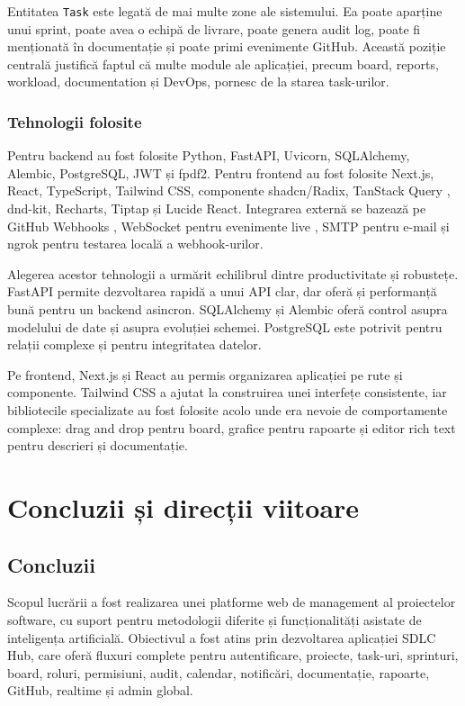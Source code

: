 \documentclass[12pt,a4paper]{report}
\begin{document}
Entitatea \texttt{Task} este legată de mai multe zone ale sistemului. Ea poate aparține unui sprint, poate avea o echipă de livrare, poate genera audit log, poate fi menționată în documentație și poate primi evenimente GitHub. Această poziție centrală justifică faptul că multe module ale aplicației, precum board, reports, workload, documentation și DevOps, pornesc de la starea task-urilor.

\subsection{Tehnologii folosite}
Pentru backend au fost folosite Python, FastAPI, Uvicorn, SQLAlchemy, Alembic, PostgreSQL, JWT și fpdf2. Pentru frontend au fost folosite Next.js, React, TypeScript, Tailwind CSS, componente shadcn/Radix, TanStack Query \cite{tanstackquery}, dnd-kit, Recharts, Tiptap și Lucide React. Integrarea externă se bazează pe GitHub Webhooks \cite{githubwebhooks}, WebSocket pentru evenimente live \cite{websocketmdn}, SMTP pentru e-mail și ngrok pentru testarea locală a webhook-urilor.

Alegerea acestor tehnologii a urmărit echilibrul dintre productivitate și robustețe. FastAPI permite dezvoltarea rapidă a unui API clar, dar oferă și performanță bună pentru un backend asincron. SQLAlchemy și Alembic oferă control asupra modelului de date și asupra evoluției schemei. PostgreSQL este potrivit pentru relații complexe și pentru integritatea datelor.

Pe frontend, Next.js și React au permis organizarea aplicației pe rute și componente. Tailwind CSS a ajutat la construirea unei interfețe consistente, iar bibliotecile specializate au fost folosite acolo unde era nevoie de comportamente complexe: drag and drop pentru board, grafice pentru rapoarte și editor rich text pentru descrieri și documentație.


\chapter{Concluzii și direcții viitoare}
\label{chap:concluzii}

\section{Concluzii}
Scopul lucrării a fost realizarea unei platforme web de management al proiectelor software, cu suport pentru metodologii diferite și funcționalități asistate de inteligența artificială. Obiectivul a fost atins prin dezvoltarea aplicației SDLC Hub, care oferă fluxuri complete pentru autentificare, proiecte, task-uri, sprinturi, board, roluri, permisiuni, audit, calendar, notificări, documentație, rapoarte, GitHub, realtime și admin global.
\end{document}
